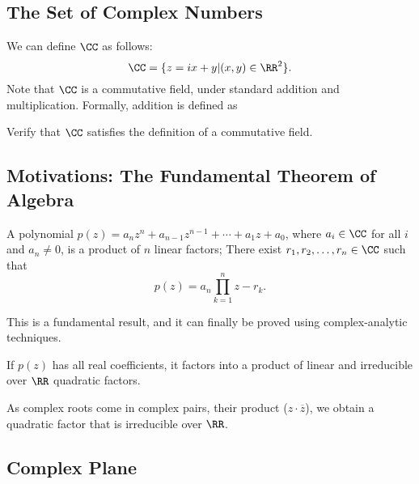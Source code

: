 \subsection{The Set of Complex Numbers}

We can define $\CC$ as follows:
\[ \CC = \{ z = ix +y | (x,y) \in \RR^2 \}. \] 
Note that $\CC$ is a commutative field, under standard addition and multiplication. Formally, addition is defined as 

\begin{exercise}
Verify that $\CC$ satisfies the definition of a commutative field. 
\end{exercise}

\subsection{Motivations: The Fundamental Theorem of Algebra}
\begin{theorem}
A polynomial $p(z) = a_nz^n + a_{n-1}z^{n-1} + \cdots + a_1z + a_0$, where $a_i \in \CC$ for all $i$ and $a_n \neq 0$, is a product of $n$ linear factors; There exist $r_1, r_2, \ldots, r_n \in \CC$ such that 
\[ p(z) = a_n\prod_{k=1}^n z-r_k. \] 
\end{theorem}
This is a fundamental result, and it can finally be proved using complex-analytic techniques. 
\begin{corollary*}
If $p(z)$ has all real coefficients, it factors into a product of linear and irreducible over $\RR$ quadratic factors. 
\end{corollary*}
As complex roots come in complex pairs, their product ($z\cdot \overline{z}$), we obtain a quadratic factor that is irreducible over $\RR$. 
\subsection{Complex Plane}





